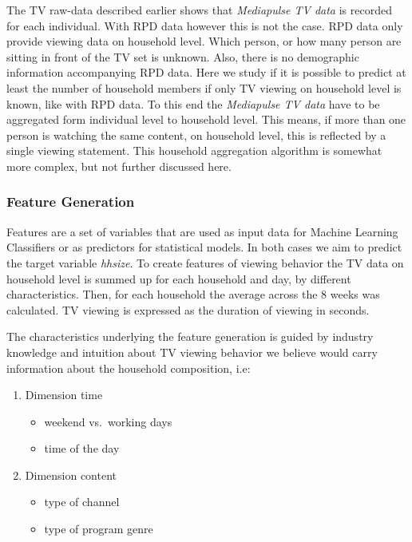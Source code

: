\documentclass[]{article}
\providecommand{\tightlist}{%
  \setlength{\itemsep}{0pt}\setlength{\parskip}{0pt}}
\begin{document}
The TV raw-data described earlier shows that \emph{Mediapulse TV data}
is recorded for each individual. With RPD data however this is not the
case. RPD data only provide viewing data on household level. Which
person, or how many person are sitting in front of the TV set is
unknown. Also, there is no demographic information accompanying RPD
data. Here we study if it is possible to predict at least the number of
household members if only TV viewing on household level is known, like
with RPD data. To this end the \emph{Mediapulse TV data} have to be
aggregated form individual level to household level. This means, if more
than one person is watching the same content, on household level, this
is reflected by a single viewing statement. This household aggregation
algorithm is somewhat more complex, but not further discussed here.

\subsubsection{Feature Generation}\label{feature-generation}

Features are a set of variables that are used as input data for Machine
Learning Classifiers or as predictors for statistical models. In both
cases we aim to predict the target variable \emph{hhsize}. To create
features of viewing behavior the TV data on household level is summed up
for each household and day, by different characteristics. Then, for each
household the average across the 8 weeks was calculated. TV viewing is
expressed as the duration of viewing in seconds.

The characteristics underlying the feature generation is guided by
industry knowledge and intuition about TV viewing behavior we believe
would carry information about the household composition, i.e:

\begin{enumerate}
\def\labelenumi{\arabic{enumi}.}
\tightlist
\item
  Dimension time

  \begin{itemize}
  \tightlist
  \item
    weekend vs.~working days
  \item
    time of the day
  \end{itemize}
\item
  Dimension content

  \begin{itemize}
  \tightlist
  \item
    type of channel
  \item
    type of program genre
  \end{itemize}
\end{enumerate}
\end{document}
